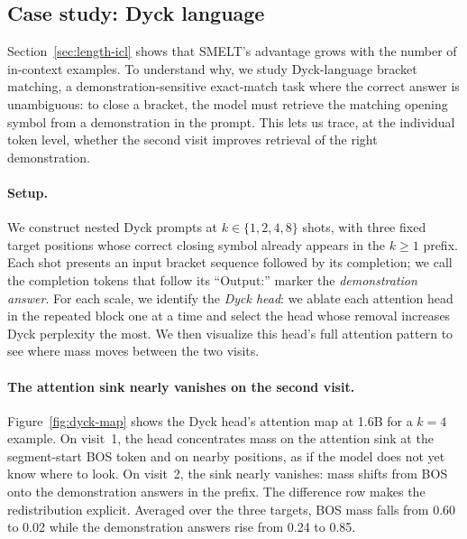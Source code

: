 \documentclass[]{bytedance_seed}
\newcommand{\archname}{SMELT}
\theoremstyle{definition}
\theoremstyle{remark}
\begin{document}
\subsection{Case study: Dyck language}
\label{sec:dyck}

%
Section~\ref{sec:length-icl} shows that \archname{}'s advantage grows with the number of in-context examples.
To understand why, we study Dyck-language bracket matching, a demonstration-sensitive exact-match task where the correct answer is unambiguous: to close a bracket, the model must retrieve the matching opening symbol from a demonstration in the prompt.
This lets us trace, at the individual token level, whether the second visit improves retrieval of the right demonstration.

%
\paragraph{Setup.}
We construct nested Dyck prompts at $k \in \{1, 2, 4, 8\}$ shots, with three fixed target positions whose correct closing symbol already appears in the $k \ge 1$ prefix.
Each shot presents an input bracket sequence followed by its completion; we call the completion tokens that follow its ``Output:'' marker the \textit{demonstration answer}.
For each scale, we identify the \textit{Dyck head}: we ablate each attention head in the repeated block one at a time and select the head whose removal increases Dyck perplexity the most.
We then visualize this head's full attention pattern to see where mass moves between the two visits.

%
\paragraph{The attention sink nearly vanishes on the second visit.}
Figure~\ref{fig:dyck-map} shows the Dyck head's attention map at 1.6B for a $k = 4$ example.
On visit~1, the head concentrates mass on the attention sink at the segment-start BOS token and on nearby positions, as if the model does not yet know where to look.
On visit~2, the sink nearly vanishes: mass shifts from BOS onto the demonstration answers in the prefix.
The difference row makes the redistribution explicit.
Averaged over the three targets, BOS mass falls from 0.60 to 0.02 while the demonstration answers rise from 0.24 to 0.85.
\end{document}
